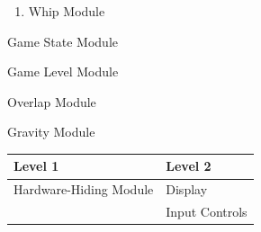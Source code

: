 \documentclass[12pt, titlepage]{article}
\newcounter{mnum}
\newcommand{\mthemnum}{M\themnum}
\begin{document}
\begin{description}
{\begin{enumerate}
        \item \label{mBH2.26} Whip Module
    \end{enumerate}}
\item [\refstepcounter{mnum} \mthemnum \label{mBH3}:] Game State Module
\item [\refstepcounter{mnum} \mthemnum \label{mBH4}:] Game Level Module
\item [\refstepcounter{mnum} \mthemnum \label{mSD1}:] Overlap Module
\item [\refstepcounter{mnum} \mthemnum \label{mSD2}:] Gravity Module
\end{description}


\begin{table}[H]
\centering
\begin{tabular}{p{} p{}}
\toprule
\textbf{Level 1} & \textbf{Level 2}\\
\midrule

{Hardware-Hiding Module} & Display \\
& Input Controls \\
\midrule


\end{tabular}
\end{table}
\end{document}
